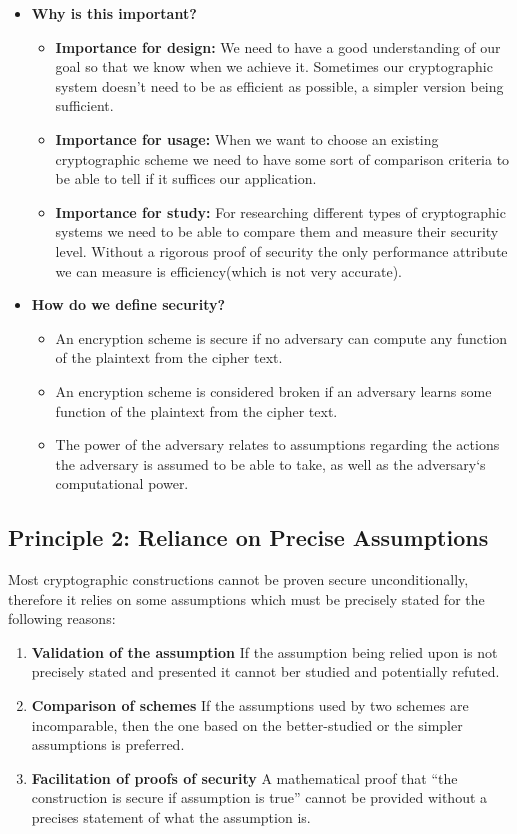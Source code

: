 \begin{itemize}
    \item \textbf{Why is this important?}
    \begin{itemize}
        \item \textbf{Importance for design:} We need to have a good understanding of our goal so that
we know when we achieve it. Sometimes our cryptographic system doesn't need to
be as efficient as possible, a simpler version being sufficient.
        \item \textbf{Importance for usage:} When we want to choose an existing cryptographic scheme
we need to have some sort of comparison criteria to be able to tell if it suffices our
application.
        \item \textbf{Importance for study:} For researching different types of cryptographic systems
we need to be able to compare them and measure their security level. Without
a rigorous proof of security the only performance attribute we can measure is
efficiency(which is not very accurate).
    \end{itemize}
    \item \textbf{How do we define security?}
    \begin{itemize}
        \item \textcolor{R}{An encryption scheme is secure if no adversary can compute any function of the
plaintext from the cipher text.}
        \item \textcolor{B}{An encryption scheme is considered broken if an adversary learns some function of
the plaintext from the cipher text.}
        \item \textcolor{G}{The power of the adversary relates to assumptions regarding the actions the
adversary is assumed to be able to take, as well as the adversary`s computational
power.}
    \end{itemize}
\end{itemize}

\subsection{Principle 2: Reliance on Precise Assumptions}

Most cryptographic constructions cannot be proven secure unconditionally, therefore it relies on some assumptions which must be precisely stated for the following reasons:

\begin{enumerate}
\item \textbf{Validation of the assumption} If the assumption being relied upon is not precisely stated and presented it cannot ber studied and potentially refuted.
\item \textbf{Comparison of schemes} If the assumptions used by two schemes are incomparable, then the one based on the better-studied or the simpler assumptions is preferred.
\item \textbf{Facilitation of proofs of security} A mathematical proof that ``the construction is secure if assumption is true'' cannot be provided without a precises statement of what the assumption is.
\end{enumerate}

